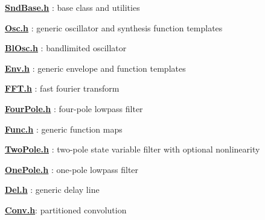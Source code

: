 {\bfseries \hyperlink{_snd_base_8h}{Snd\+Base.\+h}} \+: base class and utilities

{\bfseries \hyperlink{_osc_8h}{Osc.\+h}} \+: generic oscillator and synthesis function templates

{\bfseries \hyperlink{_bl_osc_8h}{Bl\+Osc.\+h}} \+: bandlimited oscillator

{\bfseries \hyperlink{_env_8h}{Env.\+h}} \+: generic envelope and function templates

{\bfseries \hyperlink{_f_f_t_8h}{F\+F\+T.\+h}} \+: fast fourier transform

{\bfseries \hyperlink{_four_pole_8h}{Four\+Pole.\+h}} \+: four-\/pole lowpass filter

{\bfseries \hyperlink{_func_8h}{Func.\+h}} \+: generic function maps

{\bfseries \hyperlink{_two_pole_8h}{Two\+Pole.\+h}} \+: two-\/pole state variable filter with optional nonlinearity

{\bfseries \hyperlink{_one_pole_8h}{One\+Pole.\+h}} \+: one-\/pole lowpass filter

{\bfseries \hyperlink{_del_8h}{Del.\+h}} \+: generic delay line

{\bfseries \hyperlink{_conv_8h}{Conv.\+h}}\+: partitioned convolution 